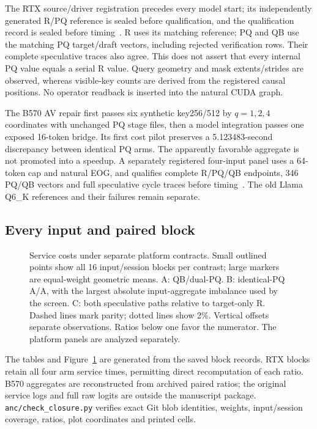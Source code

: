 The RTX source/driver registration precedes every model start; its independently generated R/PQ reference is sealed before qualification, and the qualification record is sealed before timing~\cite{rtxservicerecords}. R uses its matching reference; PQ and QB use the matching PQ target/draft vectors, including rejected verification rows. Their complete speculative traces also agree. This does not assert that every internal PQ value equals a serial R value. Query geometry and mask extents/strides are observed, whereas visible-key counts are derived from the registered causal positions. No operator readback is inserted into the natural CUDA graph.

The B570 AV repair first passes six synthetic key256/512 by $q=1,2,4$ coordinates with unchanged PQ stage files, then a model integration passes one exposed 16-token bridge. Its first cost pilot preserves a 5.123483-second discrepancy between identical PQ arms. The apparently favorable aggregate is not promoted into a speedup. A separately registered four-input panel uses a 64-token cap and natural EOG, and qualifies complete R/PQ/QB endpoints, 346 PQ/QB vectors and full speculative cycle traces before timing~\cite{b570gqarecords,b570servicerecords}. The old Llama Q6\_K references and their failures remain separate.

\subsection{Every input and paired block}


\begin{figure}[t]
\centering
\caption{Service costs under separate platform contracts. Small outlined points show all 16 input/session blocks per contrast; large markers are equal-weight geometric means. A: QB/dual-PQ. B: identical-PQ A/A, with the largest absolute input-aggregate imbalance used by the screen. C: both speculative paths relative to target-only R. Dashed lines mark parity; dotted lines show 2\%. Vertical offsets separate observations. Ratios below one favor the numerator. The platform panels are analyzed separately.}
\label{fig:servicepanels}
\end{figure}
The tables and Figure~\ref{fig:servicepanels} are generated from the saved block records. RTX blocks retain all four arm service times, permitting direct recomputation of each ratio. B570 aggregates are reconstructed from archived paired ratios; the original service logs and full raw logits are outside the manuscript package. \texttt{anc/check\_closure.py} verifies exact Git blob identities, weights, input/session coverage, ratios, plot coordinates and printed cells.

